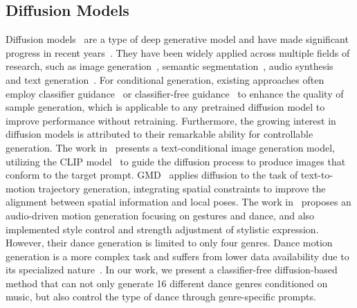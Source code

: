 \subsection{Diffusion Models}
Diffusion models~\cite{ho2020denoising,nichol2021improved,dhariwal2021diffusion} are a type of deep generative model and have made significant progress in recent years~\cite{croitoru2023diffusion}.
They have been widely applied across multiple fields of research, such as image generation~\cite{austin2021structured,ho2022cascaded,ruiz2023dreambooth,ramesh2022hierarchical}, semantic segmentation~\cite{baranchuk2021label,brempong2022denoising,poole2022dreamfusion}, audio synthesis~\cite{liu2024audioldm2,liu2023audioldm,kong2020diffwave}
and text generation~\cite{austin2021structured,lovelace2024latent,he2022diffusionbert}. For conditional generation, existing approaches often employ classifier guidance~\cite{chung2022improving,dhariwal2021diffusion} or classifier-free guidance~\cite{nichol2021glide,rombach2022high} to enhance the quality of sample generation, which is applicable to any pretrained diffusion model to improve performance without retraining. Furthermore, the growing interest in diffusion models is attributed to their remarkable ability for controllable generation. The work in~\cite{avrahami2022blended} presents a text-conditional image generation model, utilizing the CLIP model~\cite{radford2021learning} to guide the diffusion process to produce images that conform to the target prompt. GMD~\cite{karunratanakul2023guided} applies diffusion to the task of text-to-motion trajectory generation, integrating spatial constraints to improve the alignment between spatial information and local poses. The work in~\cite{alexanderson2023listen} proposes an audio-driven motion generation focusing on gestures and dance, and also implemented style control and strength adjustment of stylistic expression. However, their dance generation is limited to only four genres. Dance motion generation is a more complex task and suffers from lower data availability due to its specialized nature~\cite{tseng2023edge}. In our work, we present a classifier-free diffusion-based method that can not only generate 16 different dance genres conditioned on music, but also control the type of dance through genre-specific prompts.



